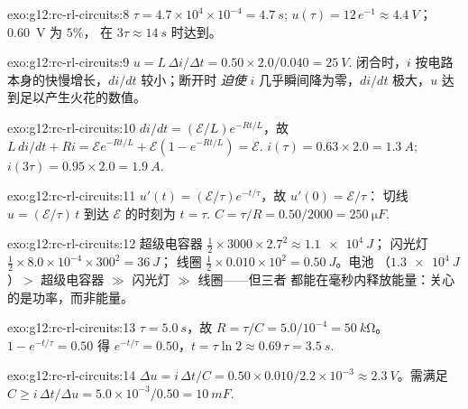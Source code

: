 \begin{solution}{exo:g12:rc-rl-circuits:8}
$\tau = 4.7\times10^{4} \times 10^{-4} = \qty{4.7}{s}$;
$u(\tau) = 12\,e^{-1} \approx \qty{4.4}{V}$；\qty{0.60}{V} 为 $5\%$，
在 $3\tau \approx \qty{14}{s}$ 时达到。
\end{solution}

\begin{solution}{exo:g12:rc-rl-circuits:9}
$u = L\,\Delta i/\Delta t = 0.50 \times 2.0/0.040 = \qty{25}{V}$.
闭合时，$i$ 按电路本身的快慢增长，$di/dt$ 较小；断开时
\emph{迫使} $i$ 几乎瞬间降为零，$di/dt$ 极大，$u$
达到足以产生火花的数值。
\end{solution}

\begin{solution}{exo:g12:rc-rl-circuits:10}
$di/dt = (\mathcal{E}/L)e^{-Rt/L}$，故 $L\,di/dt + Ri =
\mathcal{E}e^{-Rt/L} + \mathcal{E}(1 - e^{-Rt/L}) = \mathcal{E}$.
$i(\tau) = 0.63 \times 2.0 = \qty{1.3}{A}$;
$i(3\tau) = 0.95 \times 2.0 = \qty{1.9}{A}$.
\end{solution}

\begin{solution}{exo:g12:rc-rl-circuits:11}
$u'(t) = (\mathcal{E}/\tau)e^{-t/\tau}$，故 $u'(0) = \mathcal{E}/\tau$：
切线 $u = (\mathcal{E}/\tau)\,t$ 到达 $\mathcal{E}$ 的时刻为
$t = \tau$. $C = \tau/R = 0.50/2000 = \qty{250}{\micro F}$.
\end{solution}

\begin{solution}{exo:g12:rc-rl-circuits:12}
超级电容器 $\tfrac12 \times 3000 \times 2.7^2 \approx \qty{1.1e4}{J}$；
闪光灯 $\tfrac12 \times 8.0\times10^{-4} \times 300^2 = \qty{36}{J}$；
线圈 $\tfrac12 \times 0.010 \times 10^2 = \qty{0.50}{J}$。电池
（$\qty{1.3e4}{J}$）$>$ 超级电容器 $\gg$ 闪光灯 $\gg$ 线圈——但三者
都能在毫秒内释放能量：关心的是功率，而非能量。
\end{solution}

\begin{solution}{exo:g12:rc-rl-circuits:13}
$\tau = \qty{5.0}{s}$，故 $R = \tau/C = 5.0/10^{-4} = \qty{50}{k\ohm}$。
$1 - e^{-t/\tau} = 0.50$ 得 $e^{-t/\tau} = 0.50$，$t = \tau\ln 2
\approx 0.69\,\tau = \qty{3.5}{s}$.
\end{solution}

\begin{solution}{exo:g12:rc-rl-circuits:14}
$\Delta u = i\,\Delta t/C = 0.50 \times 0.010/2.2\times10^{-3} \approx
\qty{2.3}{V}$。需满足 $C \geq i\,\Delta t/\Delta u =
5.0\times10^{-3}/0.50 = \qty{10}{mF}$.
\end{solution}

